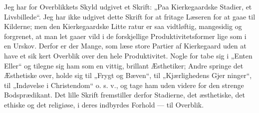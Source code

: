 \documentclass[12pt]{book}
\begin{document}
Jeg har for Overblikkets Skyld udgivet et Skrift:
„Paa Kierkegaardske Stadier, et Livsbillede“. Jeg har
ikke udgivet dette Skrift for at fritage Læseren for
at gaae til Kilderne; men den Kierkegaardske Litte\-%
ratur er saa vidtløftig, mangesidig og forgrenet, at man
let gaaer vild i de forskjellige Produktivitetsformer lige\-%
som i en Urskov. Derfor er der Mange, som læse
store Partier af Kierkegaard uden at have et sik\-%
kert Overblik over den hele Produktivitet. Nogle for\-%
tabe sig i „Enten Eller“ og tilegne sig ham som en vittig,
brillant Æsthetiker; Andre springe det Æsthetiske over,
holde sig til „Frygt og Bæven“, til „Kjærlighedens Gjer\-%
ninger“, til „Indøvelse i Christendom“ o. s. v., og tage
ham uden videre for den strenge Bodsprædikant. Det
lille Skrift fremstiller derfor Stadierne, det æsthetiske,
det ethiske og det religiøse, i deres indbyrdes Forhold
--- til Overblik.
\end{document}
